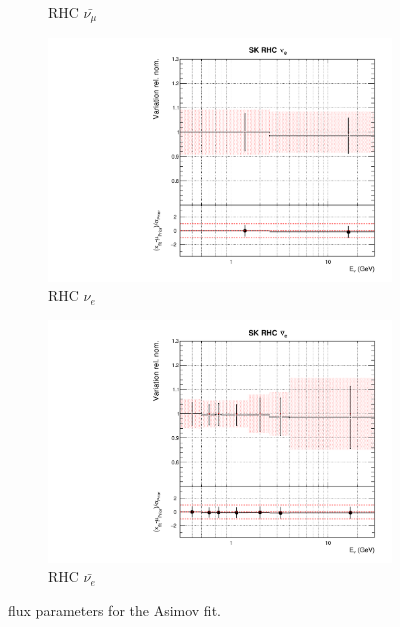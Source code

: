 \begin{figure}[!htbp]
\begin{subfigure}{0.45\textwidth}
  \caption{\SK RHC $\bar{\nu_{\mu}}$}
\end{subfigure}
\begin{subfigure}{0.45\textwidth}
  \centering
  \includegraphics[width=0.75\linewidth]{figs/asmvfluxpoly14}
  \caption{\SK RHC $\nu_{e}$}
\end{subfigure}
\begin{subfigure}{0.45\textwidth}
  \centering
  \includegraphics[width=0.75\linewidth]{figs/asmvfluxpoly15}
  \caption{\SK RHC $\bar{\nu_e}$}
\end{subfigure}
\caption{\SK flux parameters for the Asimov fit.}
\label{fig:asmvfluxSKapp}
\end{figure}


